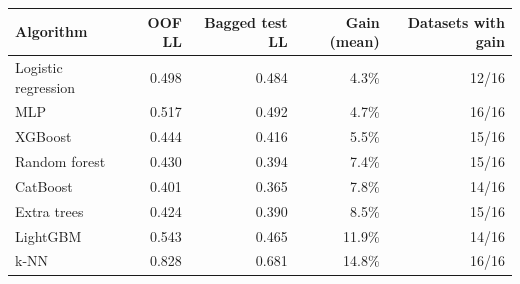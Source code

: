 \begin{tabular}{lrrrr}
\toprule
Algorithm & OOF LL & Bagged test LL & Gain (mean) & Datasets with gain\\
\midrule
Logistic regression & 0.498 & 0.484 & 4.3\% & 12/16\\
MLP & 0.517 & 0.492 & 4.7\% & 16/16\\
XGBoost & 0.444 & 0.416 & 5.5\% & 15/16\\
Random forest & 0.430 & 0.394 & 7.4\% & 15/16\\
CatBoost & 0.401 & 0.365 & 7.8\% & 14/16\\
Extra trees & 0.424 & 0.390 & 8.5\% & 15/16\\
LightGBM & 0.543 & 0.465 & 11.9\% & 14/16\\
k-NN & 0.828 & 0.681 & 14.8\% & 16/16\\
\bottomrule
\end{tabular}
